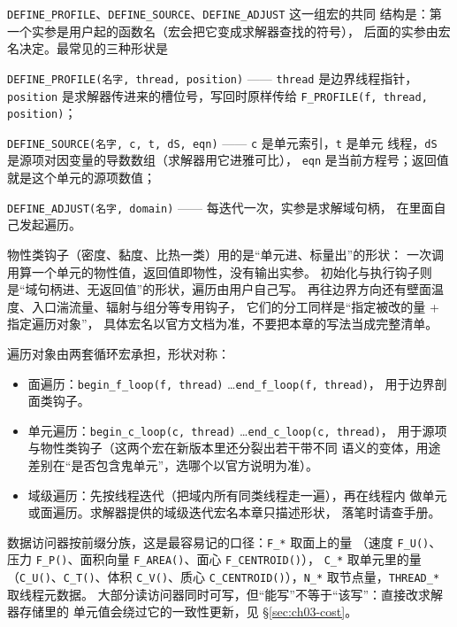 \documentclass[12pt,a4paper,fontset=fandol]{ctexbook}
\newcommand{\Fn}[1]{\texttt{#1()}}
\newcommand{\Tp}[1]{\texttt{#1}}
\begin{document}
\Tp{DEFINE\_PROFILE}、\Tp{DEFINE\_SOURCE}、\Tp{DEFINE\_ADJUST} 这一组宏的共同
结构是：第一个实参是用户起的函数名（宏会把它变成求解器查找的符号），
后面的实参由宏名决定。最常见的三种形状是

\Tp{DEFINE\_PROFILE(名字, thread, position)} —— \Tp{thread} 是边界线程指针，
\Tp{position} 是求解器传进来的槽位号，写回时原样传给
\Tp{F\_PROFILE(f, thread, position)}；

\Tp{DEFINE\_SOURCE(名字, c, t, dS, eqn)} —— \Tp{c} 是单元索引，\Tp{t} 是单元
线程，\Tp{dS} 是源项对因变量的导数数组（求解器用它进雅可比），
\Tp{eqn} 是当前方程号；返回值就是这个单元的源项数值；

\Tp{DEFINE\_ADJUST(名字, domain)} —— 每迭代一次，实参是求解域句柄，
在里面自己发起遍历。

物性类钩子（密度、黏度、比热一类）用的是``单元进、标量出''的形状：
一次调用算一个单元的物性值，返回值即物性，没有输出实参。
初始化与执行钩子则是``域句柄进、无返回值''的形状，遍历由用户自己写。
再往边界方向还有壁面温度、入口湍流量、辐射与组分等专用钩子，
它们的分工同样是``指定被改的量 + 指定遍历对象''，
具体宏名以官方文档为准，不要把本章的写法当成完整清单。

遍历对象由两套循环宏承担，形状对称：

\begin{itemize}
  \item 面遍历：\Tp{begin\_f\_loop(f, thread)} \ldots \Tp{end\_f\_loop(f, thread)}，
        用于边界剖面类钩子。
  \item 单元遍历：\Tp{begin\_c\_loop(c, thread)} \ldots \Tp{end\_c\_loop(c, thread)}，
        用于源项与物性类钩子（这两个宏在新版本里还分裂出若干带不同
        语义的变体，用途差别在``是否包含鬼单元''，选哪个以官方说明为准）。
  \item 域级遍历：先按线程迭代（把域内所有同类线程走一遍），再在线程内
        做单元或面遍历。求解器提供的域级迭代宏名本章只描述形状，
        落笔时请查手册。
\end{itemize}

数据访问器按前缀分族，这是最容易记的口径：\Tp{F\_*} 取面上的量
（速度 \Fn{F\_U}、压力 \Fn{F\_P}、面积向量 \Fn{F\_AREA}、面心 \Fn{F\_CENTROID}），
\Tp{C\_*} 取单元里的量（\Fn{C\_U}、\Fn{C\_T}、体积 \Fn{C\_V}、质心
\Fn{C\_CENTROID}），\Tp{N\_*} 取节点量，\Tp{THREAD\_*} 取线程元数据。
大部分读访问器同时可写，但``能写''不等于``该写''：直接改求解器存储里的
单元值会绕过它的一致性更新，见 \S\ref{sec:ch03-cost}。
\end{document}
